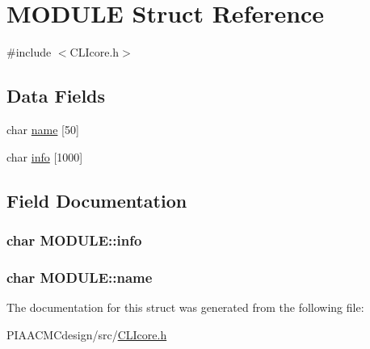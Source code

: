 \hypertarget{structMODULE}{\section{M\+O\+D\+U\+L\+E Struct Reference}
\label{structMODULE}
}


{\ttfamily \#include $<$C\+L\+Icore.\+h$>$}

\subsection*{Data Fields}
\begin{DoxyCompactItemize}
\item 
char \hyperlink{structMODULE_aa1be7698e70471b56973f54283d620b0}{name} \mbox{[}50\mbox{]}
\item 
char \hyperlink{structMODULE_a41ab9dec38e41ec9f2d9b3710a4b0ea3}{info} \mbox{[}1000\mbox{]}
\end{DoxyCompactItemize}


\subsection{Field Documentation}
\hypertarget{structMODULE_a41ab9dec38e41ec9f2d9b3710a4b0ea3}{
\subsubsection[{info}]{\setlength{\rightskip}{0pt plus 5cm}char M\+O\+D\+U\+L\+E\+::info}}\label{structMODULE_a41ab9dec38e41ec9f2d9b3710a4b0ea3}
\hypertarget{structMODULE_aa1be7698e70471b56973f54283d620b0}{
\subsubsection[{name}]{\setlength{\rightskip}{0pt plus 5cm}char M\+O\+D\+U\+L\+E\+::name}}\label{structMODULE_aa1be7698e70471b56973f54283d620b0}


The documentation for this struct was generated from the following file\+:\begin{DoxyCompactItemize}
\item 
P\+I\+A\+A\+C\+M\+Cdesign/src/\hyperlink{PIAACMCdesign_2src_2CLIcore_8h}{C\+L\+Icore.\+h}\end{DoxyCompactItemize}
